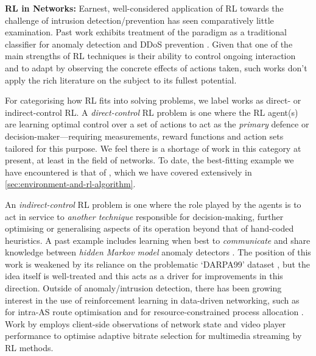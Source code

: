 \documentclass[conference, a4paper, 10pt, times]{IEEEtran}
\newcommand{\fakepara}[1]{\noindent\textbf{#1:}}
\begin{document}
\fakepara{RL in Networks}
Earnest, well-considered application of RL towards the challenge of intrusion detection/prevention has seen comparatively little examination.
Past work exhibits treatment of the paradigm as a traditional classifier for anomaly detection \cite{shamshirband2014anomaly} and DDoS prevention \cite{DBLP:conf/mates/ServinK08}.
Given that one of the main strengths of RL techniques is their ability to control ongoing interaction and to adapt by observing the concrete effects of actions taken, such works don't apply the rich literature on the subject to its fullest potential.

For categorising how RL fits into solving problems, we label works as direct- or indirect-control RL.
A \emph{direct-control} RL problem is one where the RL agent(s) are learning optimal control over a set of actions to act as the \emph{primary} defence or decision-maker---requiring measurements, reward functions and action sets tailored for this purpose.
We feel there is a shortage of work in this category at present, at least in the field of networks.
To date, the best-fitting example we have encountered is that of \textcite{DBLP:journals/eaai/MalialisK15}, which we have covered extensively in \cref{sec:environment-and-rl-algorithm}.

An \emph{indirect-control} RL problem is one where the role played by the agents is to act in service to \emph{another technique} responsible for decision-making, further optimising or generalising aspects of its operation beyond that of hand-coded heuristics.
A past example includes learning when best to \emph{communicate} and share knowledge between \emph{hidden Markov model} anomaly detectors \cite{DBLP:conf/paisi/XuSH07}.
The position of this work is weakened by its reliance on the problematic `DARPA99' dataset \cite{DARPA-IDD, DBLP:conf/cisda/TavallaeeBLG09, DBLP:conf/sp/SommerP10}, but the idea itself is well-treated and this acts as a driver for improvements in this direction.
Outside of anomaly/intrusion detection, there has been growing interest in the use of reinforcement learning in data-driven networking, such as for intra-AS route optimisation \cite{DBLP:conf/hotnets/ValadarskySST17} and for resource-constrained process allocation \cite{DBLP:conf/hotnets/MaoAMK16}.
Work by \textcite{DBLP:conf/sigcomm/MaoNA17} employs client-side observations of network state and video player performance to optimise adaptive bitrate selection for multimedia streaming by RL methods.
\end{document}
